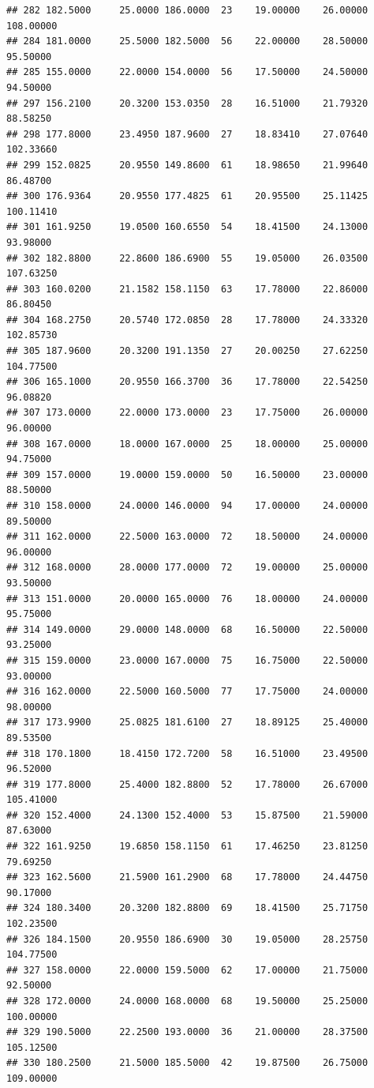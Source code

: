 \documentclass[]{article}
\begin{document}
\begin{verbatim}
## 282 182.5000     25.0000 186.0000  23    19.00000    26.00000 108.00000
## 284 181.0000     25.5000 182.5000  56    22.00000    28.50000  95.50000
## 285 155.0000     22.0000 154.0000  56    17.50000    24.50000  94.50000
## 297 156.2100     20.3200 153.0350  28    16.51000    21.79320  88.58250
## 298 177.8000     23.4950 187.9600  27    18.83410    27.07640 102.33660
## 299 152.0825     20.9550 149.8600  61    18.98650    21.99640  86.48700
## 300 176.9364     20.9550 177.4825  61    20.95500    25.11425 100.11410
## 301 161.9250     19.0500 160.6550  54    18.41500    24.13000  93.98000
## 302 182.8800     22.8600 186.6900  55    19.05000    26.03500 107.63250
## 303 160.0200     21.1582 158.1150  63    17.78000    22.86000  86.80450
## 304 168.2750     20.5740 172.0850  28    17.78000    24.33320 102.85730
## 305 187.9600     20.3200 191.1350  27    20.00250    27.62250 104.77500
## 306 165.1000     20.9550 166.3700  36    17.78000    22.54250  96.08820
## 307 173.0000     22.0000 173.0000  23    17.75000    26.00000  96.00000
## 308 167.0000     18.0000 167.0000  25    18.00000    25.00000  94.75000
## 309 157.0000     19.0000 159.0000  50    16.50000    23.00000  88.50000
## 310 158.0000     24.0000 146.0000  94    17.00000    24.00000  89.50000
## 311 162.0000     22.5000 163.0000  72    18.50000    24.00000  96.00000
## 312 168.0000     28.0000 177.0000  72    19.00000    25.00000  93.50000
## 313 151.0000     20.0000 165.0000  76    18.00000    24.00000  95.75000
## 314 149.0000     29.0000 148.0000  68    16.50000    22.50000  93.25000
## 315 159.0000     23.0000 167.0000  75    16.75000    22.50000  93.00000
## 316 162.0000     22.5000 160.5000  77    17.75000    24.00000  98.00000
## 317 173.9900     25.0825 181.6100  27    18.89125    25.40000  89.53500
## 318 170.1800     18.4150 172.7200  58    16.51000    23.49500  96.52000
## 319 177.8000     25.4000 182.8800  52    17.78000    26.67000 105.41000
## 320 152.4000     24.1300 152.4000  53    15.87500    21.59000  87.63000
## 322 161.9250     19.6850 158.1150  61    17.46250    23.81250  79.69250
## 323 162.5600     21.5900 161.2900  68    17.78000    24.44750  90.17000
## 324 180.3400     20.3200 182.8800  69    18.41500    25.71750 102.23500
## 326 184.1500     20.9550 186.6900  30    19.05000    28.25750 104.77500
## 327 158.0000     22.0000 159.5000  62    17.00000    21.75000  92.50000
## 328 172.0000     24.0000 168.0000  68    19.50000    25.25000 100.00000
## 329 190.5000     22.2500 193.0000  36    21.00000    28.37500 105.12500
## 330 180.2500     21.5000 185.5000  42    19.87500    26.75000 109.00000

\end{verbatim}
\end{document}
